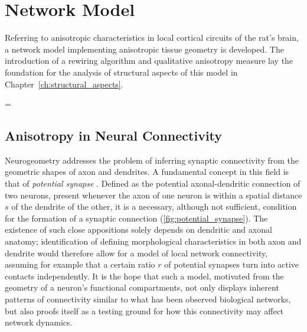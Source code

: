 \chapter{Network Model}\label{ch:Network Model} 

Referring to anisotropic characteristics in local cortical circuits of
the rat's brain, a network model implementing anisotropic tissue
geometry is developed. The introduction of a rewiring algorithm and
qualitative anisotropy measure %
lay the foundation for the analysis of structural aspects of this
model in Chapter~\ref{ch:structural_aspects}.

\parskip = \baselineskip %
\setlength{\parindent}{0pt}

\clearpage
\section{Anisotropy in Neural Connectivity}\label{sec:biol_anisotropy}







Neurogeometry addresses the problem of inferring
synaptic connectivity from the geometric shapes of axon and
dendrites. A fundamental concept in this field is that of
\textit{potential synapse}
\parencite{Stepanyants2002}. Defined as the potential axonal-dendritic
connection of two neurons, present whenever the axon of one neuron is
within a spatial distance $s$ of the dendrite of the other, it is a
necessary, although not sufficient, condition for the formation of a
synaptic connection (\autoref{fig:potential_synapse}). The existence
of such close appositions solely depends on dendritic and axonal
anatomy; identification of defining morphological characteristics in
both axon and dendrite would therefore allow for a model of local
network connectivity, assuming for example that a certain ratio $r$ of
potential synapses turn into active contacts independently. It is the
hope that such a model, motivated from the geometry of a neuron's
functional compartments, not only displays inherent patterns of
connectivity similar to what has been observed biological networks,
but also proofs itself as a testing ground for how this connectivity
may affect network dynamics.

